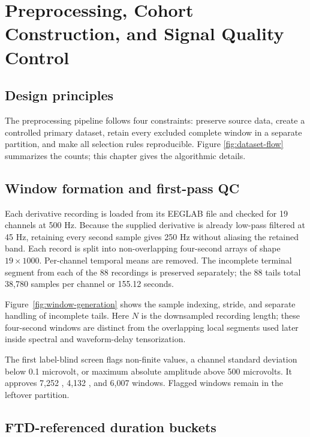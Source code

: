 \chapter{Preprocessing, Cohort Construction, and Signal Quality Control}
\label{ch:preprocessing}

\section{Design principles}

The preprocessing pipeline follows four constraints: preserve source data,
create a controlled primary dataset, retain every excluded complete window in a
separate partition, and make all selection rules reproducible. Figure
\ref{fig:dataset-flow} summarizes the counts; this chapter gives the algorithmic
details.

\section{Window formation and first-pass QC}

Each derivative recording is loaded from its EEGLAB  file and checked
for 19 channels at 500 Hz. Because the supplied derivative is already low-pass
filtered at 45 Hz, retaining every second sample gives 250 Hz without aliasing
the retained band. Each record is split into non-overlapping four-second arrays
of shape $19\times1000$. Per-channel temporal means are removed. The incomplete
terminal segment from each of the 88 recordings is preserved separately; the
88 tails total 38,780 samples per channel or 155.12 seconds.

Figure~\ref{fig:window-generation} shows the sample indexing, stride, and
separate handling of incomplete tails. Here $N$ is the downsampled recording
length; these four-second windows are distinct from the overlapping local
segments used later inside spectral and waveform-delay tensorization.



The first label-blind screen flags non-finite values, a channel standard
deviation below 0.1 microvolt, or maximum absolute amplitude above 500
microvolts. It approves 7,252 \AD{}, 4,132 \FTD{}, and 6,007 \CN{} windows.
Flagged windows remain in the leftover partition.

\section{FTD-referenced duration buckets}

